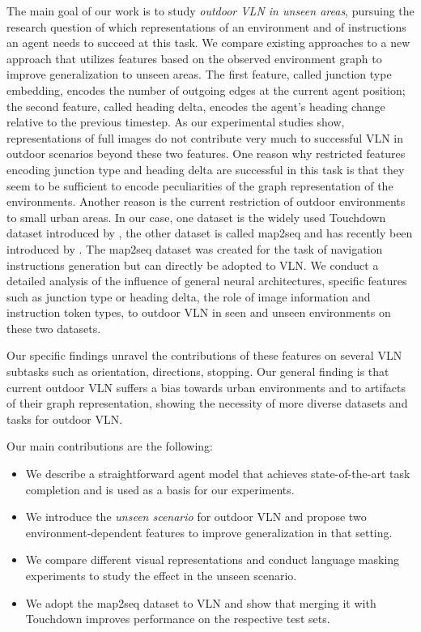 \documentclass[11pt]{article}
\begin{document}
The main goal of our work is to study \textit{outdoor VLN in unseen areas}, pursuing the research question of which representations of an environment and of instructions an agent needs to succeed at this task. We compare existing approaches to a new approach that utilizes features based on the observed environment graph to improve generalization to unseen areas. The first feature, called junction type embedding, encodes the number of outgoing edges at the current agent position; the second feature, called heading delta, encodes the agent's heading change relative to the previous timestep. As our experimental studies show, representations of full images do not contribute very much to successful VLN in outdoor scenarios beyond these two features. One reason why restricted features encoding junction type and heading delta are successful in this task is that they seem to be sufficient to encode peculiarities of the graph representation of the environments. Another reason is the current restriction of outdoor environments to small urban areas. In our case, one dataset is the widely used Touchdown dataset introduced by \citet{Chen2018Touchdown}, the other dataset is called map2seq and has recently been introduced by \citet{schumann-riezler-2021-map2seq}. The map2seq dataset was created for the task of navigation instructions generation but can directly be adopted to VLN. We conduct a detailed analysis of the influence of general neural architectures, specific features such as junction type or heading delta, the role of image information and instruction token types, to outdoor VLN in seen and unseen environments on these two datasets.

Our specific findings unravel the contributions of these features on several VLN subtasks such as orientation, directions, stopping. Our general finding is that current outdoor VLN suffers a bias towards urban environments and to artifacts of their graph representation, showing the necessity of more diverse datasets and tasks for outdoor VLN.


Our main contributions are the following:
 \begin{itemize}
     \item We describe a straightforward agent model that achieves state-of-the-art task completion and is used as a basis for our experiments.
     \item We introduce the \textit{unseen scenario} for outdoor VLN and propose two environment-dependent features to improve generalization in that setting.
     \item We compare different visual representations and conduct language masking experiments to study the effect in the unseen scenario.
     \item We adopt the map2seq dataset to VLN and show that merging it with Touchdown improves performance on the respective test sets.
\end{itemize}
\end{document}
